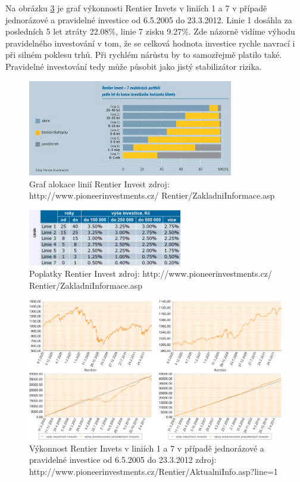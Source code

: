 \documentclass[a4paper,12pt]{article}
\begin{document}
		Na obrázku \ref{ri_graf} je graf výkonnosti Rentier Invets v liniích 1 a 7 v případě jednorázové a pravidelné investice od 6.5.2005 do 23.3.2012. Linie 1 dosáhla za posledních 5 let ztráty 22.08\%, linie 7 zisku 9.27\%. Zde názorně vidíme výhodu pravidelného investování v tom, že se celková hodnota investice rychle navrací i při silném poklesu trhů. Při rychlém nárůstu by to samozřejmě platilo také. Pravidelné investování tedy může působit jako jistý stabilizátor rizika.
		\begin{figure}[h!]
		  	\centering
			\includegraphics[width=0.8\textwidth]{graf_alokace_linii.png}			
			\caption{Graf alokace linií Rentier Invest zdroj: http://www.pioneerinvestments.cz/ Rentier/ZakladniInformace.asp}
			\label{ri_linie}
		\end{figure}
		\begin{figure}[h!]
		  	\centering
			\includegraphics[width=0.6\textwidth]{ri_cost.png}			
			\caption{Poplatky Rentier Invest zdroj: http://www.pioneerinvestments.cz/ Rentier/ZakladniInformace.asp}
			\label{ri_cost}
		\end{figure}
		\begin{figure}[h!]
		  	\centering
			\includegraphics[width=1.0\textwidth]{ri_graf.png}			
			\caption{Výkonnost Rentier Invets v liniích 1 a 7 v případě jednorázové a pravidelné investice od 6.5.2005 do 23.3.2012 zdroj: http://www.pioneerinvestments.cz/Rentier/AktualniInfo.asp?line=1}
			\label{ri_graf}
		\end{figure}
\clearpage
\end{document}
